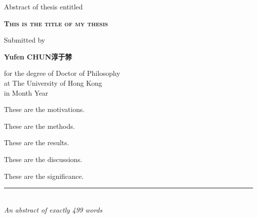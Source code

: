 

%
%
\begin{titlepage}
	\begin{center}
	
	Abstract of thesis entitled\\
	
	 \bigskip 
	   	
        \huge\textsc{\textbf{This is the title of my thesis}} \\
            
        \bigskip
        	
        {\normalsize Submitted by}\\
			
	\bigskip  	
        
        \Large{\textbf{Yufen CHUN}}\textbf{淳于棼}\\
       
	\bigskip
	       
	{\normalsize
	for the degree of Doctor of Philosophy\\
	at The University of Hong Kong\\
	in Month Year\\}
        
        \end{center}    
	
	\bigskip
	
	These are the motivations. \lipsum[1]
	
	These are the methods. \lipsum[1]
	
	These are the results. \lipsum[1]
	
	These are the discussions. \lipsum[1]
	
	These are the significance. \lipsum[1]
	
	\bigskip
	
	\begin{center}
	
	\rule{6cm}{0.025cm}\\
	{\slshape An abstract of exactly 499 words}
	
	\end{center}  
\end{titlepage}   
